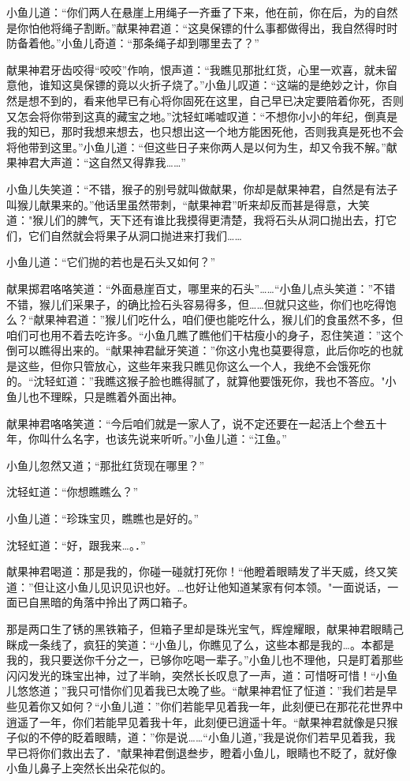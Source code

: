 \documentclass[12pt,oneside]{book}
\begin{document}
小鱼儿道：``你们两人在悬崖上用绳子一齐垂了下来，他在前，你在后，为的自然是你怕他将绳子割断。''献果神君道：``这臭保镖的什么事都做得出，我自然得时时防备着他。''小鱼儿奇道：``那条绳子却到哪里去了？''

献果神君牙齿咬得``咬咬''作响，恨声道：``我瞧见那批红货，心里一欢喜，就未留意他，谁知这臭保镖的竟以火折子烧了。''小鱼儿叹道：``这端的是绝妙之计，你自然是想不到的，看来他早已有心将你固死在这里，自己早已决定要陪着你死，否则又怎会将你带到这真的藏宝之地。''沈轻虹唏嘘叹道：``不想你小小的年纪，倒真是我的知已，那时我想来想去，也只想出这一个地方能困死他，否则我真是死也不会将他带到这里。''小鱼儿道：``但这些日子来你两人是以何为生，却又令我不解。''献果神君大声道：``这自然又得靠我\ldots\ldots{}''

小鱼儿失笑道：``不错，猴子的别号就叫做献果，你却是献果神君，自然是有法子叫猴儿献果来的。''他话里虽然带刺，``献果神君''听来却反而甚是得意，大笑道："猴儿们的脾气，天下还有谁比我摸得更清楚，我将石头从洞口抛出去，打它们，它们自然就会将果子从洞口抛进来打我们\ldots\ldots{}

小鱼儿道：``它们抛的若也是石头又如何？''

献果掷君咯咯笑道：``外面悬崖百丈，哪里来的石头''\ldots\ldots{}``小鱼儿点头笑道：''不错不错，猴儿们采果子，的确比捡石头容易得多，但\ldots\ldots 但就只这些，你们也吃得饱么？``献果神君道：''猴儿们吃什么，咱们便也能吃什么，猴儿们的食虽然不多，但咱们可也用不着去吃许多。``小鱼几瞧了瞧他们干枯瘦小的身子，忍住笑道：''这个倒可以瞧得出来的。``献果神君龇牙笑道：''你这小鬼也莫要得意，此后你吃的也就是这些，但你只管放心，这些年来我只瞧见你这么一个人，我绝不会饿死你的。``沈轻虹道：''我瞧这猴子脸也瞧得腻了，就算他要饿死你，我也不答应。"小鱼儿也不理睬，只是瞧着外面出神。

献果神君咯咯笑道：``今后咱们就是一家人了，说不定还要在一起活上个叁五十年，你叫什么名字，也该先说来听听。''小鱼儿道：``江鱼。''

小鱼儿忽然又道；``那批红货现在哪里？''

沈轻虹道：``你想瞧瞧么？''

小鱼儿道：``珍珠宝贝，瞧瞧也是好的。''

沈轻虹道：``好，跟我来\ldots。．''

献果神君喝道：那是我的，你碰一碰就打死你！``他瞪着眼睛发了半天威，终又笑道：''但让这小鱼儿见识见识也好。\ldots 也好让他知道某家有何本领。"一面说话，一面已自黑暗的角落中拎出了两口箱子。

那是两口生了锈的黑铁箱子，但箱子里却是珠光宝气，辉煌耀眼，献果神君眼睛己眯成一条线了，疯狂的笑道：``小鱼儿，你瞧见了么，这些本都是我的\ldots。本都是我的，我只要送你千分之一，已够你吃喝一辈子。''小鱼儿也不理他，只是盯着那些闪闪发光的珠宝出神，过了半晌，突然长长叹息了一声，道：可惜呀可惜！``小鱼儿悠悠道；''我只可惜你们见着我已太晚了些。``献果神君怔了怔道：''我们若是早些见着你又如何？``小鱼儿道：''你们若能早见着我一年，此刻便已在那花花世界中逍遥了一年，你们若能早见着我十年，此刻便已逍遥十年。``献果神君就像是只猴子似的不停的眨着眼睛，道：''你是说\ldots\ldots{}``小鱼儿道，''我是说你们若早见着我，我早已将你们救出去了．"献果神君倒退叁步，瞪着小鱼儿，眼睛也不眨了，就好像小鱼儿鼻子上突然长出朵花似的。
\end{document}
